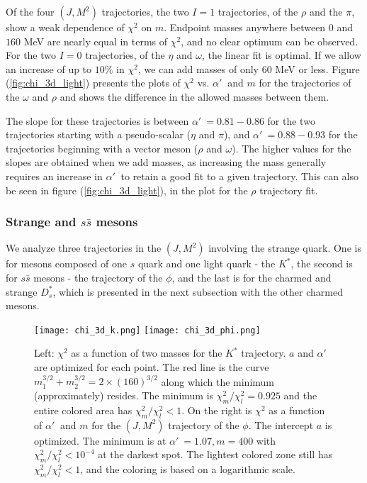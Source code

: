 \documentclass[11pt,a4]{article}
\newcommand{\alp}{\ensuremath{\alpha'\:}}
\newcommand{\ssb}{s\bar{s}}
\newcommand{\rchi}[1]{\ensuremath{\chi^2_m/\chi^2_l = #1}}
\begin{document}
			Of the four \((J,M^2)\) trajectories, the two \(I = 1\) trajectories, of the \(\rho\) and the \(\pi\), show a weak dependence of \(\chi^2\) on \(m\). Endpoint masses anywhere between \(0\) and \(160\) MeV are nearly equal in terms of \(\chi^2\), and no clear optimum can be observed. For the two \(I = 0\) trajectories, of the \(\eta\) and \(\omega\), the linear fit is optimal. If we allow an increase of up to \(10\%\) in \(\chi^2\), we can add masses of only \(60\) MeV or less. Figure (\ref{fig:chi_3d_light}) presents the plots of \(\chi^2\) vs. \(\alp\) and \(m\) for the trajectories of the \(\omega\) and \(\rho\) and shows the difference in the allowed masses between them.
			
			The slope for these trajectories is between \(\alp = 0.81-0.86\) for the two trajectories starting with a pseudo-scalar (\(\eta\) and \(\pi\)), and \(\alp = 0.88-0.93\) for the trajectories beginning with a vector meson (\(\rho\) and \(\omega\)). The higher values for the slopes are obtained when we add masses, as increasing the mass generally requires an increase in \(\alp\) to retain a good fit to a given trajectory. This can also be seen in figure (\ref{fig:chi_3d_light}), in the plot for the \(\rho\) trajectory fit.
			
		\subsubsection{Strange and \texorpdfstring{$\ssb$}{s-sbar} mesons}
			We analyze three trajectories in the \((J,M^2)\) involving the strange quark. One is for mesons composed of one \(s\) quark and one light quark - the \(K^*\), the second is for \(\ssb\) mesons - the trajectory of the \(\phi\), and the last is for the charmed and strange \(D^*_s\), which is presented in the next subsection with the other charmed mesons.
					\begin{figure}[t!] \centering %
						\texttt{[image: chi\_3d\_k.png]}	 \hfill
						\texttt{[image: chi\_3d\_phi.png]}
						\caption{\label{fig:chi_j_strange} Left: \(\chi^2\) as a function of two masses for the \(K^*\) trajectory. \(a\) and \(\alp\) are optimized for each point. The red line is the curve \(m_1^{3/2}+m_2^{3/2} = 2\times(160)^{3/2}\) along which the minimum (approximately) resides. The minimum is \(\rchi{0.925}\) and the entire colored area has \(\chi^2_m/\chi^2_l < 1\). On the right is \(\chi^2\) as a function of \(\alp\) and \(m\) for the \((J,M^2)\) trajectory of the \(\phi\). The intercept \(a\) is optimized. The minimum is at \(\alp = 1.07, m = 400\) with \(\chi^2_m/\chi^2_l < 10^{-4}\) at the darkest spot. The lightest colored zone still has \(\chi^2_m/\chi^2_l < 1\), and the coloring is based on a logarithmic scale.}
				\end{figure}
			
\end{document}
